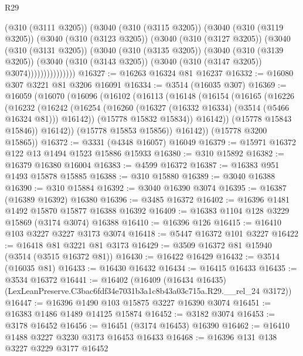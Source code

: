 \begin{lexlean}{R29}
\begin{coremodule}
                (@310 (@3111 @3205))
                (@3040
                  (@310 (@3115 @3205))
                  (@3040
                    (@310 (@3119 @3205))
                    (@3040
                      (@310 (@3123 @3205))
                      (@3040
                        (@310 (@3127 @3205))
                        (@3040
                          (@310 (@3131 @3205))
                          (@3040
                            (@310 (@3135 @3205))
                            (@3040
                              (@310 (@3139 @3205))
                              (@3040
                                (@310 (@3143 @3205))
                                (@3040 (@310 (@3147 @3205)) @3074)))))))))))))))
@16327 := @16263 @16324 @81 @16237
@16332 := @16080 @307 @3221 @81 @3206 @16091
@16334 := @3514 (@16035 @307)
@16369 := @16059
    (@16070
      (@16096
        (@16102
          (@16113
            (@16148
              (@16154
                (@16165
                  (@16226
                    (@16232
                      (@16242
                        (@16254 (@16260 (@16327 (@16332 @16334) (@3514 (@5466 @16324 @81))) @16142))
                        (@15778 @15832 @15834))
                      @16142))
                  (@15778 @15843 @15846))
                @16142))
            (@15778 @15853 @15856))
          @16142))
      (@15778 @3200 @15865))
@16372 := @3331 (@4348 @16057) @16049
@16379 := @15971 @16372 @122 @13 @1494 @1523 @15886 @15933
@16380 := @310 @15892
@16382 := @16379 @16380 @16004
@16383 := @4599 @16372
@16387 := @16383 @951 @1493 @15878 @15885
@16388 := @310 @15880
@16389 := @3040 @16388
@16390 := @310 @15884
@16392 := @3040 @16390 @3074
@16395 := @16387 (@16389 @16392) @16380
@16396 := @3485 @16372
@16402 := @16396 @1481 @1492 @15870 @15877 @16388 @16392
@16409 := @16383 @1104 @128 @3229 @15869 (@3174 @3074) @16388
@16410 := @16396 @126
@16415 := @16410 @103 @3227 @3227 @3173 @3074
@16418 := @5447 @16372 @101 @3227
@16422 := @16418 @81 @3221 @81 @3173
@16429 := @3509 @16372 @81 @15940 (@3514 (@3515 @16372 @81))
@16430 := @16422 @16429
@16432 := @3514 (@16035 @81)
@16433 := @16430 @16432
@16434 := @16415 @16433
@16435 := @3534 @16372
@16441 := @16402
    (@16409 (@16434 @16435) (LexLeanPreserve.C3bac6fdf34e7031b3a1c8b43a03c715a.R29.__rel_24 @3172))
@16447 := @16396 @1490 @103 @15875 @3227 @16390 @3074
@16451 := @16383 @1486 @1489 @14125 @15874
@16452 := @3182 @3074
@16453 := @3178 @16452
@16456 := @16451 (@3174 @16453) @16390
@16462 := @16410 @1488 @3227 @3230 @3173 @16453 @16433
@16468 := @16396 @131 @138 @3227 @3229 @3177 @16452

\end{coremodule}
\end{lexlean}
